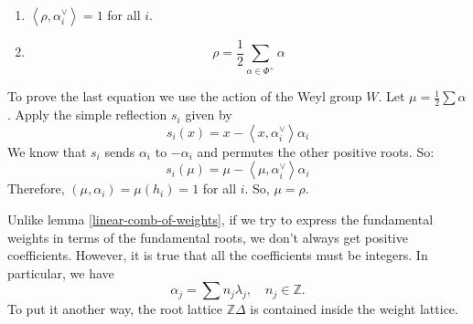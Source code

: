 \documentclass[12pt]{article} %
\begin{document}
\begin{enumerate}
    \item $\left\langle\rho,\alpha_i^\vee\right\rangle = 1$ for all $i$.
    \item
          \[
              \rho = \frac{1}{2} \sum_{\alpha \in \Phi^+} \alpha
          \]
\end{enumerate}

To prove the last equation we use the action of the Weyl group $W$. Let $\mu = \frac{1}{2} \sum \alpha$. Apply the simple reflection $s_i$ given by
\[
    s_i(x) = x - \left\langle x, \alpha_i^\vee\right\rangle \alpha_i
\]
We know that $s_i$ sends $\alpha_i$ to $-\alpha_i$ and permutes the other positive roots. So:
\[
    s_i(\mu) = \mu -  \left\langle \mu, \alpha_i^\vee\right\rangle  \alpha_i
\]
Therefore, $(\mu, \alpha_i) = \mu(h_i) = 1$ for all $i$. So, $\mu = \rho$.

Unlike lemma \ref{linear-comb-of-weights}, if we try to express the fundamental weights in terms of the fundamental roots, we don't always
get positive coefficients. However, it is true that all the coefficients must be integers. In particular, we have
\[\alpha_j = \sum n_j\lambda_j, \quad n_j \in \mathbb{Z}.\]
To put it another way, the root lattice $\mathbb{Z}\Delta$ is contained inside the weight lattice.
\end{document}
